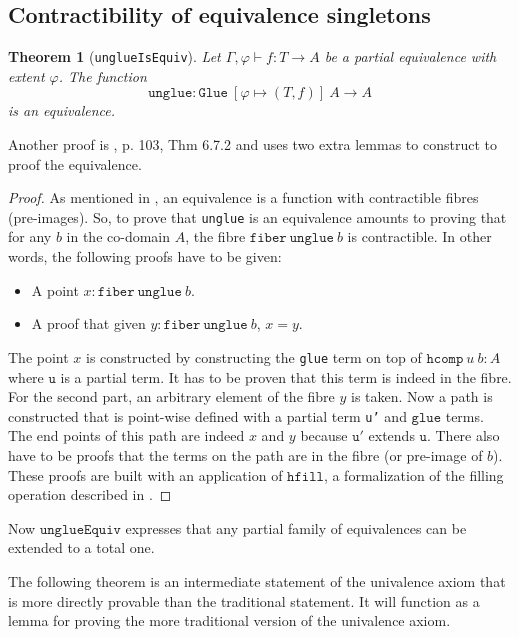 \documentclass[12pt,a4paper,twoside,xetex]{book} %
\newtheorem{theorem}{Theorem}[section]
\newcommand{\op}[1]{\mathtt{#1}}
\begin{document}
\subsection{Contractibility of equivalence singletons}

\begin{theorem}[\texttt{unglueIsEquiv}]
Let $\Gamma, \varphi \vdash f : T \rightarrow A$ be a partial equivalence with 
extent $\varphi$. The function $$ \op{unglue} : \op{Glue} \ \left[\varphi 
\mapsto (T,f) \right] \ A \rightarrow A$$ is an equivalence. 
\end{theorem}

Another proof is \cite{Huber2016}, p. 103, Thm 6.7.2 and uses two extra 
lemmas to construct to proof the equivalence.

\begin{proof}
As mentioned in , an equivalence is a function with contractible  fibres (pre-images). So, to prove that 
\texttt{unglue} is an equivalence amounts to proving that for any $b$ in the 
co-domain $A$, the fibre $\op{fiber}\ \op{unglue} \ b$ is contractible. In 
other words, the following proofs have to be given:
\begin{itemize}
\item A point  $x : \op{fiber}\ \op{unglue} \ b$. 
\item A proof that given $y : \op{fiber}\ \op{unglue} \ b$, $x = y$. 
\end{itemize}
The point $x$ is constructed by constructing the \texttt{glue} term on top of 
$\texttt{hcomp} \ u \ b : A$ where $\op{u}$ is a partial term. It has to be 
proven that this term is indeed in the fibre. For the second part, an arbitrary 
element of the fibre $y$ is taken. Now a path is constructed that is point-wise 
defined with a partial term \texttt{u'} and $\op{glue}$ terms. The end points 
of this path are indeed $x$ and $y$ because $\op{u'}$ extends $\op{u}$. There 
also have to be proofs that the terms on the path are in the fibre (or 
pre-image of $b$). These proofs are built with an application of $\op{hfill}$, 
a formalization of the filling operation described in .
\end{proof}

Now $\op{unglueEquiv}$  expresses that any partial family of equivalences can 
be extended to a total one.

The following theorem is an intermediate statement of the univalence axiom that 
is more directly provable than the traditional statement. It will function as a 
lemma for proving the more traditional version of the univalence axiom.
\end{document}
